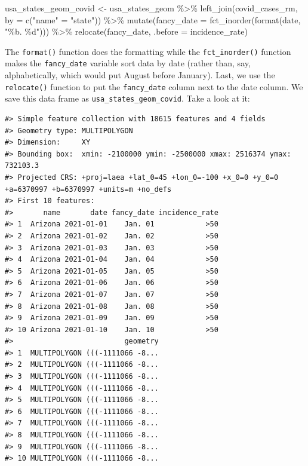 \documentclass[
]{book}
\newenvironment{Shaded}{\begin{snugshade}}{\end{snugshade}}
\newcommand{\AttributeTok}[1]{\textcolor[rgb]{0.77,0.63,0.00}{#1}}
\newcommand{\FunctionTok}[1]{\textcolor[rgb]{0.00,0.00,0.00}{#1}}
\newcommand{\NormalTok}[1]{#1}
\newcommand{\OtherTok}[1]{\textcolor[rgb]{0.56,0.35,0.01}{#1}}
\newcommand{\SpecialCharTok}[1]{\textcolor[rgb]{0.00,0.00,0.00}{#1}}
\newcommand{\StringTok}[1]{\textcolor[rgb]{0.31,0.60,0.02}{#1}}
\begin{document}
\begin{Shaded}
\begin{Highlighting}[]
\NormalTok{usa\_states\_geom\_covid }\OtherTok{\textless{}{-}}\NormalTok{ usa\_states\_geom }\SpecialCharTok{\%\textgreater{}\%}
  \FunctionTok{left\_join}\NormalTok{(covid\_cases\_rm, }\AttributeTok{by =} \FunctionTok{c}\NormalTok{(}\StringTok{"name"} \OtherTok{=} \StringTok{"state"}\NormalTok{)) }\SpecialCharTok{\%\textgreater{}\%}
  \FunctionTok{mutate}\NormalTok{(}\AttributeTok{fancy\_date =} \FunctionTok{fct\_inorder}\NormalTok{(}\FunctionTok{format}\NormalTok{(date, }\StringTok{"\%b. \%d"}\NormalTok{))) }\SpecialCharTok{\%\textgreater{}\%} 
  \FunctionTok{relocate}\NormalTok{(fancy\_date, }\AttributeTok{.before =}\NormalTok{ incidence\_rate)}
\end{Highlighting}
\end{Shaded}

The \texttt{format()} function does the formatting while the \texttt{fct\_inorder()} function makes the \texttt{fancy\_date} variable sort data by date (rather than, say, alphabetically, which would put August before January). Last, we use the \texttt{relocate()} function to put the \texttt{fancy\_date} column next to the date column. We save this data frame as \texttt{usa\_states\_geom\_covid}. Take a look at it:

\begin{verbatim}
#> Simple feature collection with 18615 features and 4 fields
#> Geometry type: MULTIPOLYGON
#> Dimension:     XY
#> Bounding box:  xmin: -2100000 ymin: -2500000 xmax: 2516374 ymax: 732103.3
#> Projected CRS: +proj=laea +lat_0=45 +lon_0=-100 +x_0=0 +y_0=0 +a=6370997 +b=6370997 +units=m +no_defs
#> First 10 features:
#>       name       date fancy_date incidence_rate
#> 1  Arizona 2021-01-01    Jan. 01            >50
#> 2  Arizona 2021-01-02    Jan. 02            >50
#> 3  Arizona 2021-01-03    Jan. 03            >50
#> 4  Arizona 2021-01-04    Jan. 04            >50
#> 5  Arizona 2021-01-05    Jan. 05            >50
#> 6  Arizona 2021-01-06    Jan. 06            >50
#> 7  Arizona 2021-01-07    Jan. 07            >50
#> 8  Arizona 2021-01-08    Jan. 08            >50
#> 9  Arizona 2021-01-09    Jan. 09            >50
#> 10 Arizona 2021-01-10    Jan. 10            >50
#>                          geometry
#> 1  MULTIPOLYGON (((-1111066 -8...
#> 2  MULTIPOLYGON (((-1111066 -8...
#> 3  MULTIPOLYGON (((-1111066 -8...
#> 4  MULTIPOLYGON (((-1111066 -8...
#> 5  MULTIPOLYGON (((-1111066 -8...
#> 6  MULTIPOLYGON (((-1111066 -8...
#> 7  MULTIPOLYGON (((-1111066 -8...
#> 8  MULTIPOLYGON (((-1111066 -8...
#> 9  MULTIPOLYGON (((-1111066 -8...
#> 10 MULTIPOLYGON (((-1111066 -8...
\end{verbatim}
\end{document}
